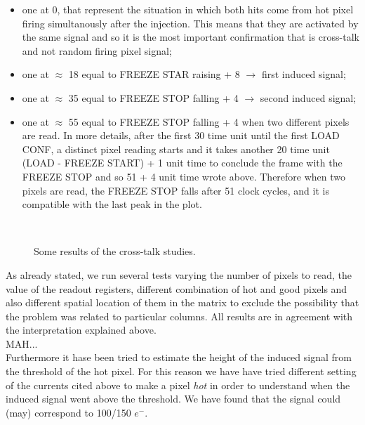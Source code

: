 \begin{itemize}
\item one at 0, that represent the situation in which both hits come from hot pixel firing simultanously after the injection. This means that they are activated by the same signal and so it is the most important confirmation that is cross-talk and not random firing pixel signal;
\item one at $\approx$ 18 equal to \textsc{FREEZE STAR} raising + 8 $\rightarrow$ first induced signal;
\item one at $\approx$ 35 equal to \textsc{FREEZE STOP} falling + 4 $\rightarrow$ second induced signal;
\item one at $\approx$ 55 equal to \textsc{FREEZE STOP} falling + 4 when two different pixels are read. In more details, after the first 30 time unit until the first \textsc{LOAD CONF}, a distinct pixel reading starts and it takes another 20 time unit (\textsc{LOAD} - \textsc{FREEZE START}) + 1 unit time to conclude the frame with the \textsc{FREEZE STOP} and so 51 + 4 unit time wrote above. Therefore when two pixels are read, the \textsc{FREEZE STOP} falls after 51 clock cycles, and it is compatible with the last peak in the plot.
\end{itemize}


\begin{figure}[h!]
\centering
{}\quad
{}\\
\caption{Some results of the cross-talk studies.}
\label{fig:xtalk}
\end{figure}

As already stated, we run several tests varying the number of pixels to read, the value of the readout registers, different combination of hot and good pixels and also different spatial location of them in the matrix to exclude the possibility that the problem was related to particular columns. All results are in agreement with the interpretation explained above.\\

MAH...\\
Furthermore it hase been tried to estimate the height of the induced signal from the threshold of the hot pixel. For this reason we have have tried different setting of the currents cited above to make a pixel \textit{hot} in order to understand when the induced signal went above the threshold. We have found that the signal could (may) correspond to 100/150 $e^{-}$.\\

